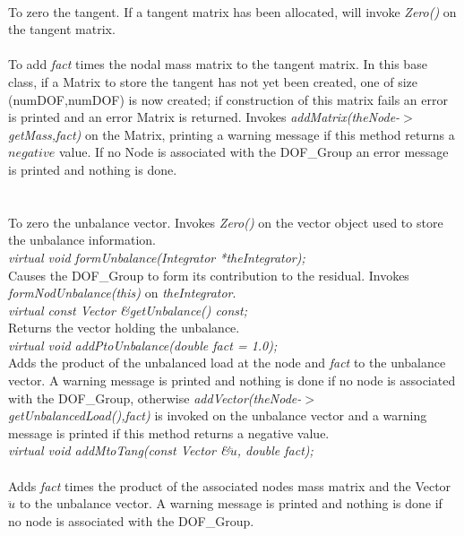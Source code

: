 \\
To zero the tangent. If a tangent matrix has been allocated,
will invoke {\em Zero()} on the tangent matrix.\\

\\
To add {\em fact} times the nodal mass matrix to the tangent
matrix. In this base class, if a Matrix to store the tangent has not
yet been created, one of size (numDOF,numDOF) is now created; if
construction of this matrix fails an error is printed and an error
Matrix is returned. Invokes {\em addMatrix(theNode-$>$getMass,fact)}
on the Matrix, printing a warning message if this method returns a
$negative$ value. If no Node is associated with the DOF\_Group an
error message is printed and nothing is done. \\

  \\
\\
To zero the unbalance vector. Invokes {\em Zero()} on the vector
object used to store the unbalance information. \\

{\em virtual void formUnbalance(Integrator *theIntegrator); }\\
Causes the DOF\_Group to form its contribution to the residual. Invokes
{\em formNodUnbalance(this)} on {\em theIntegrator}.\\

{\em virtual const Vector \&getUnbalance() const; } \\
Returns the vector holding the unbalance. \\

{\em virtual void  addPtoUnbalance(double fact = 1.0);} \\
Adds the product of the unbalanced load at the node and {\em fact} to
the unbalance vector. A warning message is printed and nothing is done
if no node is associated with the DOF\_Group, otherwise {\em
addVector(theNode-$>$getUnbalancedLoad(),fact)} is invoked on the
unbalance vector and a warning message is printed if this method
returns a negative value. \\ 

{\em virtual void addMtoTang(const Vector \&$\ddot u$,
double fact);}\\ \\ 
Adds {\em fact} times the product of the associated nodes mass matrix
and the Vector $\ddot u$ to the unbalance vector. A warning message is
printed and nothing is done if no node is associated with the
DOF\_Group. \\


